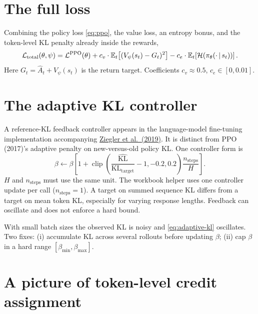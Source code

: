 \documentclass[11pt,oneside]{scrbook}
\begin{document}
\section{The full loss}

Combining the policy loss \eqref{eq:ppo}, the value loss, an entropy
bonus, and the token-level KL penalty already inside the rewards,
\begin{equation}
\mathcal{L}_{\text{total}}(\theta, \psi)
  = \mathcal{L}^{\text{PPO}}(\theta)
  + c_v \cdot \mathbb{E}_t\!\left[(V_\psi(s_t) - G_t)^2\right]
  - c_e \cdot \mathbb{E}_t\!\left[\mathcal{H}(\pi_\theta(\cdot \,\vert\, s_t))\right].
\label{eq:total}
\end{equation}
Here $G_t = \hat A_t + V_\psi(s_t)$ is the return target. Coefficients
$c_v \approx 0.5$, $c_e \in [0, 0.01]$.

\section{The adaptive KL controller}

A reference-KL feedback controller appears in the language-model
fine-tuning implementation accompanying \href{https://arxiv.org/abs/1909.08593}{Ziegler et al.\ (2019)}.
It is distinct from PPO (2017)'s adaptive penalty on new-versus-old policy KL.
One controller form is
\begin{equation}
\beta \leftarrow \beta\left[1+\operatorname{clip}
 \left(\frac{\widehat{\mathrm{KL}}}{\mathrm{KL}_{\mathrm{target}}}-1,-0.2,0.2\right)
 \frac{n_{\mathrm{steps}}}{H}\right].
\label{eq:adaptive-kl}
\end{equation}
$H$ and $n_{\mathrm{steps}}$ must use the same unit. The workbook helper uses
one controller update per call ($n_{\mathrm{steps}}=1$). A target on summed
sequence KL differs from a target on mean token KL, especially for varying
response lengths. Feedback can oscillate and does not enforce a hard bound.

\begin{pitfall}
With small batch sizes the observed KL is noisy and \eqref{eq:adaptive-kl}
oscillates. Two fixes: (i) accumulate KL across several rollouts
before updating $\beta$; (ii) cap $\beta$ in a hard range
$[\beta_{\min}, \beta_{\max}]$.
\end{pitfall}

\section{A picture of token-level credit assignment}
\end{document}

